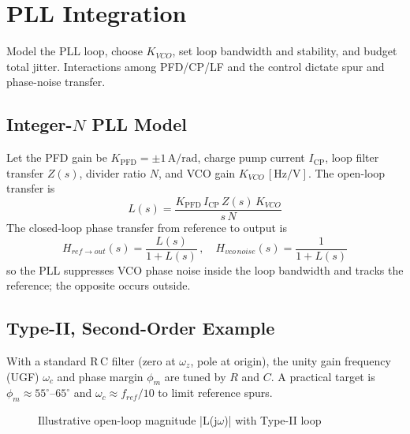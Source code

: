 \chapter{PLL Integration}
Model the PLL loop, choose \(K_{VCO}\), set loop bandwidth and stability, and budget total jitter. Interactions among PFD/CP/LF and the \VCO{} control dictate spur and phase-noise transfer.

\section{Integer-\texorpdfstring{$N$}{N} PLL Model}
Let the PFD gain be \(K_{\mathrm{PFD}}=\pm 1\,\mathrm{A/rad}\), charge pump current \(I_{\mathrm{CP}}\), loop filter transfer \(Z(s)\), divider ratio \(N\), and VCO gain \(K_{VCO}\,[\mathrm{Hz/V}]\). The open-loop transfer is
\[
 L(s) = \frac{K_{\mathrm{PFD}}\,I_{\mathrm{CP}}\,Z(s)\,K_{VCO}}{s\,N}
\]
The closed-loop phase transfer from reference to output is
\[
 H_{ref\to out}(s) = \frac{L(s)}{1+L(s)}\,,\quad H_{vco\,noise}(s) = \frac{1}{1+L(s)}
\]
so the PLL suppresses VCO phase noise inside the loop bandwidth and tracks the reference; the opposite occurs outside.

\section{Type-II, Second-Order Example}
With a standard R\,C filter (zero at \(\omega_z\), pole at origin), the unity gain frequency (UGF) \(\omega_c\) and phase margin \(\phi_m\) are tuned by \(R\) and \(C\). A practical target is \(\phi_m\approx 55^\circ\)–\(65^\circ\) and \(\omega_c \approx f_{ref}/10\) to limit reference spurs.

\begin{figure}[H]
  \centering
  \caption{Illustrative open-loop magnitude |L(j$\omega$)| with Type-II loop}
\end{figure}

